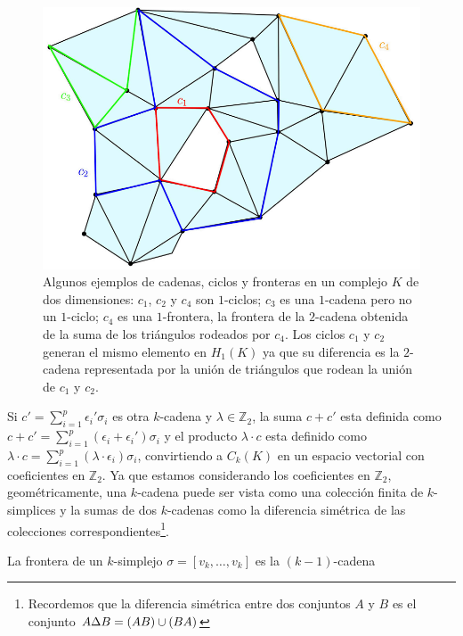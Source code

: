 \begin{figure}[ht]
    \centering
    \includegraphics[width=0.85\linewidth]{./figures/Figura6.png}
    \caption{
        Algunos ejemplos de cadenas, ciclos y fronteras en un complejo $K$ de dos dimensiones:
        $c_{1}$, $c_{2}$ y $c_{4}$ son $1$-ciclos; $c_{3}$ es una $1$-cadena pero no un $1$-ciclo;
        $c_{4}$ es una $1$-frontera, la frontera de la $2$-cadena obtenida de la suma de los
        tri\'angulos rodeados por $c_{4}$. Los ciclos $c_{1}$ y $c_{2}$ generan el mismo elemento en
        $H_{1}\left(K\right)$ ya que su diferencia es la $2$-cadena representada por la uni\'on de
        tri\'angulos que rodean la uni\'on de $c_{1}$ y $c_{2}$.
    }
    \label{fig:Figura 6}
    \vspace{15pt}
\end{figure}

Si $c'=\sum_{i=1}^{p}\epsilon_{i}'\sigma_{i}$ es otra $k$-cadena y $\lambda\in\mathbb{Z}_{2}$,
la suma $c+c'$ esta definida como $c+c'=\sum_{i=1}^{p}\left(\epsilon_{i}+\epsilon_{i}'\right)\sigma_{i}$
y el producto $\lambda\cdot c$ esta definido como
$\lambda\cdot c = \sum_{i=1}^{p}\left(\lambda\cdot\epsilon_{i}\right)\sigma_{i}$, convirtiendo a
$C_{k}\left(K\right)$ en un espacio vectorial con coeficientes en $\mathbb{Z}_{2}$. Ya que estamos
considerando los coeficientes en $\mathbb{Z}_{2}$, geom\'etricamente, una $k$-cadena puede ser vista como
una colecci\'on finita de $k$-simplices y la sumas de dos $k$-cadenas como la diferencia sim\'etrica
de las colecciones correspondientes\footnote{Recordemos que la diferencia sim\'etrica entre dos conjuntos
$A$ y $B$ es el conjunto $A\Delta B = \left(A\\B\right)\cup\left(B\\A\right)$}.

La frontera de un $k$-simplejo $\sigma = \left[v_{k},\dots,v_{k}\right]$ es la $\left(k-1\right)$-cadena

